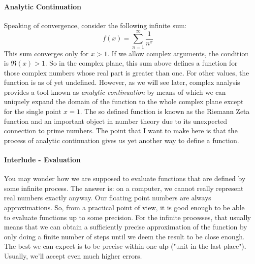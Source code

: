 \paragraph{Analytic Continuation}
Speaking of convergence, consider the following infinite sum:
\begin{equation}
 f(x) = \sum_{n=1}^\infty \frac{1}{n^x}
\end{equation}
This sum converges only for $x > 1$. If we allow complex arguments, the condition is $\Re(x) > 1$. So in the complex plane, this sum above defines a function for those complex numbers whose real part is greater than one. For other values, the function is as of yet undefined. However, as we will see later, complex analysis provides a tool known as \emph{analytic continuation} by means of which we can uniquely expand the domain of the function to the whole complex plane except for the single point $x=1$. The so defined function is known as the Riemann Zeta function and an important object in number theory due to its unexpected connection to prime numbers. The point that I want to make here is that the process of analytic continuation gives us yet another way to define a function.

\paragraph{Interlude - Evaluation}
You may wonder how we are supposed to evaluate functions that are defined by some infinite process. The answer is: on a computer, we cannot really represent real numbers exactly anyway. Our floating point numbers are always approximations. So, from a practical point of view, it is good enough to be able to evaluate functions up to some precision. For the infinite processes, that usually means that we can obtain a sufficiently precise approximation of the function by only doing a finite number of steps until we deem the result to be close enough. The best we can expect is to be precise within one ulp ("unit in the last place"). Usually, we'll accept even much higher errors.

